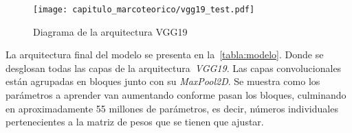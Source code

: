 \begin{figure}[H]
    \centering
    \texttt{[image: capitulo\_marcoteorico/vgg19\_test.pdf]}
    \caption{Diagrama de la arquitectura VGG19}\label{fig:vgg_diagram}
  \end{figure}

La arquitectura final del modelo se presenta en la~\autoref{tabla:modelo}. Donde
se desglosan todas las capas de la arquitectura~\emph{VGG19}. Las capas
convolucionales están agrupadas en bloques junto con su \emph{MaxPool2D}. Se
muestra como los parámetros a aprender van aumentando conforme pasan los
bloques, culminando en aproximadamente 55 millones de parámetros, es decir,
números individuales pertenecientes a la matriz de pesos que se tienen que
ajustar.

